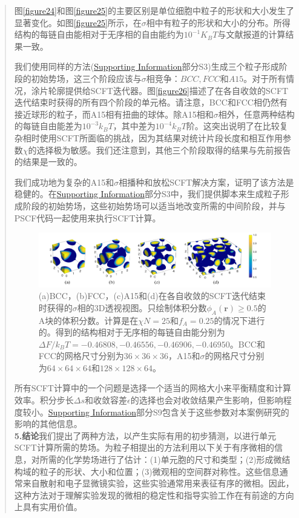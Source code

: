 \documentclass{article}
\begin{document}
\begin{CJK}{UTF8}{gkai}
\begin{quotation}
图\ref{figure24}和图\ref{figure25}的主要区别是单位细胞中粒子的形状和大小发生了显著变化。如图\ref{figure25}所示，在$\sigma$相中有粒子的形状和大小的分布。所得结构的每链自由能相对于无序相的自由能约为$10^{-1}K_BT$与文献报道的计算结果一致。

我们使用同样的方法(\href{http://pubs.acs.org/doi/suppl/10.1021/acs.macromol.6b00107/suppl_file/ma6b00107_si_001.pdf}{Supporting Information}部分S3)生成三个粒子形成阶段的初始势场，这三个阶段应该与$\sigma$相竞争：$BCC,FCC$和$A15$。对于所有情况，涂片轮廓提供给SCFT迭代器。图\ref{figure26}描述了在各自收敛的SCFT迭代结束时获得的所有四个阶段的单元格。请注意，BCC和FCC相仍然有接近球形的粒子，而A15相有扭曲的球体。除A15相和$\sigma$相外，任意两种结构的每链自由能差为$10^{-3}k_BT$，其中差为$10^{-4}k_BT$阶。这突出说明了在比较复杂相时使用SCFT所面临的挑战，因为其结果对统计片段长度和相互作用参数$\chi$的选择极为敏感。我们还注意到，其他三个阶段取得的结果与先前报告的结果是一致的。

我们成功地为复杂的A15和$\sigma$相播种和放松SCFT解决方案，证明了该方法是稳健的。在\href{http://pubs.acs.org/doi/suppl/10.1021/acs.macromol.6b00107/suppl_file/ma6b00107_si_001.pdf}{Supporting Information}部分S3中，我们提供脚本来生成粒子形成阶段的初始势场，这些初始势场可以适当地改变所需的中间阶段，并与PSCF代码一起使用来执行SCFT计算。

\begin{figure}[H]
	\centering
	\includegraphics[scale=0.5]{./figures/26.png}
	\caption{(a)BCC，(b)FCC，(c)A15和(d)在各自收敛的SCFT迭代结束时获得的$\sigma$相的3D透视视图。只绘制体积分数$\phi _A(\mathbf{r})\geq 0.5$的A块的体积分数。计算是在$\chi N=25$和$f_A=0.25$的情况下进行的。得到的结构相对于无序相的每链自由能分别为$\Delta F/k_BT=-0.46808,-0.46556,-0.46906,-0.46950$。BCC和FCC的网格尺寸分别为$36\times 36\times 36$，A15和$\sigma$的网格尺寸分别为$64\times 64\times 64$和$128\times 128 \times 64$。}
	\label{figure6}
\end{figure}

所有SCFT计算中的一个问题是选择一个适当的网格大小来平衡精度和计算效率。积分步长$\Delta s$和收敛容差$\epsilon$的选择也会对收敛结果产生影响，但影响程度较小。\href{http://pubs.acs.org/doi/suppl/10.1021/acs.macromol.6b00107/suppl_file/ma6b00107_si_001.pdf}{Supporting Information}部分S9包含关于这些参数对本案例研究的影响的其他信息。\\
\textbf{5.结论}我们提出了两种方法，以产生实际有用的初步猜测，以进行单元SCFT计算所需的势场。为粒子相提出的方法利用以下关于有序微相的信息，对所需的化学势场进行了估计：(1)单元胞的尺寸和类型；(2)形成微结构域的粒子的形状、大小和位置；(3)微观相的空间群对称性。这些信息通常来自散射和电子显微镜实验，这些实验通常用来表征有序的微相。因此，这种方法对于理解实验发现的微相的稳定性和指导实验工作在有前途的方向上具有实用价值。



\end{quotation}
\end{CJK}
\end{document}
